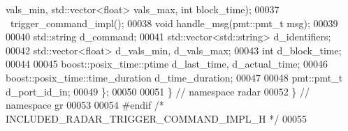 \begin{DoxyCode}
      vals\_min, std::vector<float> vals\_max, \textcolor{keywordtype}{int} block\_time);
00037       ~trigger_command_impl();
00038       \textcolor{keywordtype}{void} handle_msg(pmt::pmt\_t msg);
00039       
00040       std::string d_command;
00041       std::vector<std::string> d_identifiers;
00042       std::vector<float> d_vals_min, d_vals_max;
00043       \textcolor{keywordtype}{int} d_block_time;
00044       
00045       boost::posix\_time::ptime d_last_time, d_actual_time;
00046       boost::posix\_time::time\_duration d_time_duration;
00047       
00048       pmt::pmt\_t d_port_id_in;
00049     \};
00050 
00051   \} \textcolor{comment}{// namespace radar}
00052 \} \textcolor{comment}{// namespace gr}
00053 
00054 \textcolor{preprocessor}{#endif }\textcolor{comment}{/* INCLUDED\_RADAR\_TRIGGER\_COMMAND\_IMPL\_H */}\textcolor{preprocessor}{}
00055 
\end{DoxyCode}
